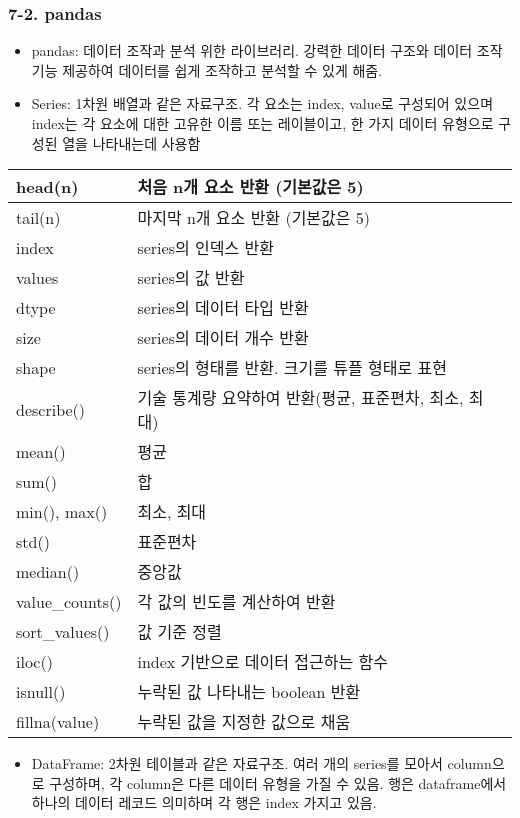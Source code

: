 \hypertarget{pandas}{%
\subsubsection{7-2. pandas}\label{pandas}}

\begin{itemize}
\tightlist
\item
  pandas: 데이터 조작과 분석 위한 라이브러리. 강력한 데이터 구조와
  데이터 조작 기능 제공하여 데이터를 쉽게 조작하고 분석할 수 있게 해줌.
\item
  Series: 1차원 배열과 같은 자료구조. 각 요소는 index, value로 구성되어
  있으며 index는 각 요소에 대한 고유한 이름 또는 레이블이고, 한 가지
  데이터 유형으로 구성된 열을 나타내는데 사용함
\end{itemize}

\begin{longtable}[]{@{}ll@{}}
\toprule
head(n) & 처음 n개 요소 반환 (기본값은 5) \\
\midrule
\endhead
tail(n) & 마지막 n개 요소 반환 (기본값은 5) \\
index & series의 인덱스 반환 \\
values & series의 값 반환 \\
dtype & series의 데이터 타입 반환 \\
size & series의 데이터 개수 반환 \\
shape & series의 형태를 반환. 크기를 튜플 형태로 표현 \\
describe() & 기술 통계량 요약하여 반환(평균, 표준편차, 최소, 최대) \\
mean() & 평균 \\
sum() & 합 \\
min(), max() & 최소, 최대 \\
std() & 표준편차 \\
median() & 중앙값 \\
value\_counts() & 각 값의 빈도를 계산하여 반환 \\
sort\_values() & 값 기준 정렬 \\
iloc() & index 기반으로 데이터 접근하는 함수 \\
isnull() & 누락된 값 나타내는 boolean 반환 \\
fillna(value) & 누락된 값을 지정한 값으로 채움 \\
\bottomrule
\end{longtable}

\begin{itemize}
\tightlist
\item
  DataFrame: 2차원 테이블과 같은 자료구조. 여러 개의 series를 모아서
  column으로 구성하며, 각 column은 다른 데이터 유형을 가질 수 있음. 행은
  dataframe에서 하나의 데이터 레코드 의미하며 각 행은 index 가지고 있음.
\end{itemize}

